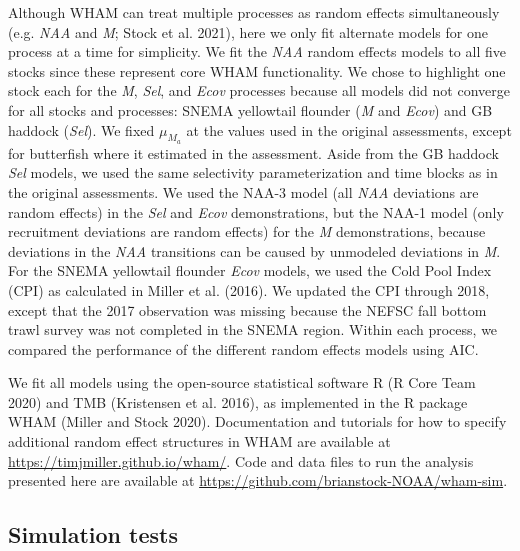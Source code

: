\documentclass[]{article}
\begin{document}
Although WHAM can treat multiple processes as random effects
simultaneously (e.g. \emph{NAA} and \emph{M}; Stock et al. 2021), here
we only fit alternate models for one process at a time for simplicity.
We fit the \emph{NAA} random effects models to all five stocks since
these represent core WHAM functionality. We chose to highlight one stock
each for the \emph{M}, \emph{Sel}, and \emph{Ecov} processes because all
models did not converge for all stocks and processes: SNEMA yellowtail
flounder (\emph{M} and \emph{Ecov}) and GB haddock (\emph{Sel}). We
fixed \(\mu_{M_a}\) at the values used in the original assessments,
except for butterfish where it estimated in the assessment. Aside from
the GB haddock \emph{Sel} models, we used the same selectivity
parameterization and time blocks as in the original assessments. We used
the NAA-3 model (all \emph{NAA} deviations are random effects) in the
\emph{Sel} and \emph{Ecov} demonstrations, but the NAA-1 model (only
recruitment deviations are random effects) for the \emph{M}
demonstrations, because deviations in the \emph{NAA} transitions can be
caused by unmodeled deviations in \emph{M}. For the SNEMA yellowtail
flounder \emph{Ecov} models, we used the Cold Pool Index (CPI) as
calculated in Miller et al. (2016). We updated the CPI through 2018,
except that the 2017 observation was missing because the NEFSC fall
bottom trawl survey was not completed in the SNEMA region. Within each
process, we compared the performance of the different random effects
models using AIC.

We fit all models using the open-source statistical software R (R Core
Team 2020) and TMB (Kristensen et al. 2016), as implemented in the R
package WHAM (Miller and Stock 2020). Documentation and tutorials for
how to specify additional random effect structures in WHAM are available
at \url{https://timjmiller.github.io/wham/}. Code and data files to run
the analysis presented here are available at
\url{https://github.com/brianstock-NOAA/wham-sim}.

\hypertarget{simulation-tests}{%
\subsection{Simulation tests}\label{simulation-tests}}
\end{document}
